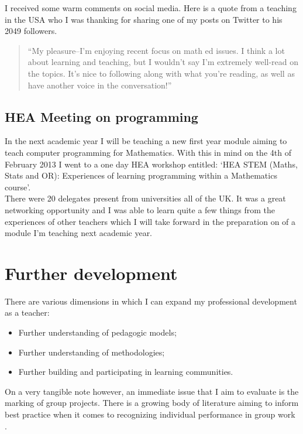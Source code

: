 \documentclass[a4paper,12pt]{article}
\begin{document}
I received some warm comments on social media. Here is a quote from a teaching in the USA who I was thanking for sharing one of my posts on Twitter to his 2049 followers.

\begin{quote}
    ``My pleasure--I'm enjoying recent focus on math ed issues.  I think a lot about learning and teaching, but I wouldn't say I'm extremely well-read on the topics.  It's nice to following along with what you're reading, as well as have another voice in the conversation!''
\end{quote}

\subsection{HEA Meeting on programming}

In the next academic year I will be teaching a new first year module aiming to teach computer programming for Mathematics. With this in mind on the 4th of February 2013 I went to a one day HEA workshop entitled: `HEA STEM (Maths, Stats and OR): Experiences of learning programming within a Mathematics course'.\\

There were 20 delegates present from universities all of the UK. It was a great networking opportunity and I was able to learn quite a few things from the experiences of other teachers which I will take forward in the preparation on of a module I'm teaching next academic year.\\

\section{Further development}

There are various dimensions in which I can expand my professional development as a teacher:

\begin{itemize}
    \item Further understanding of pedagogic models;
    \item Further understanding of methodologies;
    \item Further building and participating in learning communities.
\end{itemize}

On a very tangible note however, an immediate issue that I aim to evaluate is the marking of group projects. There is a growing body of literature aiming to inform best practice when it comes to recognizing individual performance in group work \cite{Lejk1996a}.\\
\end{document}
